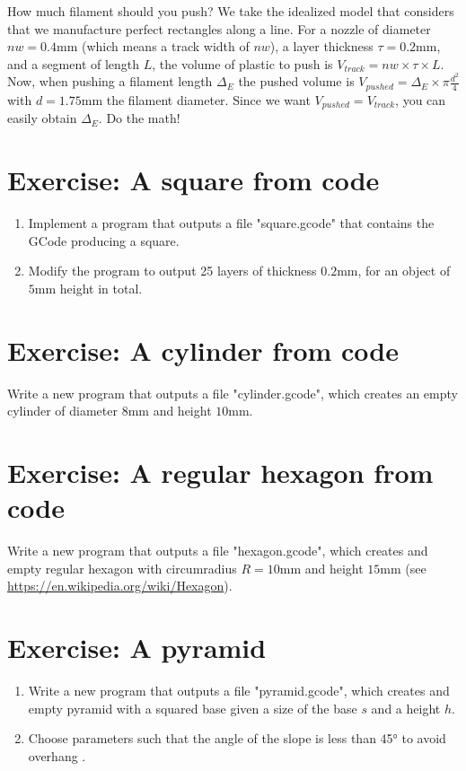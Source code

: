\documentclass{article}
\begin{document}
How much filament should you push? We take the idealized model that considers that we manufacture perfect rectangles along a line. 
For a nozzle of diameter $nw=0.4$mm (which means a track width of $nw$), a layer thickness $\tau=0.2$mm, and a segment of length $L$, the volume of plastic to push is $V_{track} = nw \times \tau \times L$. Now, when pushing a filament length $\Delta_E$ the pushed volume is $V_{pushed} = \Delta_E \times \pi \frac{d^2}{4}$ with $d = 1.75$mm the filament diameter. Since we want $V_{pushed} = V_{track}$, you can easily obtain $\Delta_E$. Do the math!


\section{Exercise: A square from code}

\begin{enumerate}
	\item Implement a program that outputs a file "square.gcode" that contains the GCode producing a square.
	\item Modify the program to output 25 layers of thickness $0.2$mm, for an object of $5$mm height in total.
\end{enumerate}

\section{Exercise: A cylinder from code}

Write a new program that outputs a file "cylinder.gcode", which creates an empty cylinder of diameter $8$mm and height $10$mm.


\section{Exercise: A regular hexagon from code}

Write a new program that outputs a file "hexagon.gcode", which creates and empty regular hexagon  with circumradius $R = 10$mm  and height $15$mm (see \url{https://en.wikipedia.org/wiki/Hexagon}).

\section{Exercise: A pyramid}

\begin{enumerate}
\item Write a new program that outputs a file "pyramid.gcode", which creates and empty pyramid with a squared base given a size of the base $s$ and a height $h$.
\item Choose parameters such that the angle of the slope is less than 45° to avoid overhang .
\end{enumerate}
\end{document}
